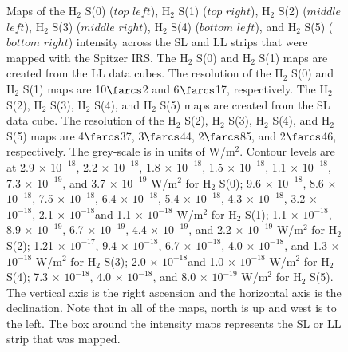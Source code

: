 \documentclass[manuscript]{aastex}
\begin{document}
\begin{figure}
\caption{Maps of the $\mathrm{H_2}$ S(0) ($top$ $left$), $\mathrm{H_2}$ S(1) ($top$ $right$), $\mathrm{H_2}$ S(2) ($middle$ $left$), $\mathrm{H_2}$ S(3) ($middle$ $right$), $\mathrm{H_2}$ S(4) ($bottom$ $left$), and $\mathrm{H_2}$ S(5) ($bottom$ $right$) intensity across the SL and LL strips that were mapped with the Spitzer IRS.  The $\mathrm{H_2}$ S(0) and $\mathrm{H_2}$ S(1) maps are created from the LL data cubes. The resolution of the $\mathrm{H_2}$ S(0) and $\mathrm{H_2}$ S(1) maps are 10$\farcs$2 and 6$\farcs$17, respectively.   The $\mathrm{H_2}$ S(2), $\mathrm{H_2}$ S(3), $\mathrm{H_2}$ S(4), and $\mathrm{H_2}$ S(5) maps are created from the SL data cube.  The resolution of the $\mathrm{H_2}$ S(2), $\mathrm{H_2}$ S(3), $\mathrm{H_2}$ S(4), and $\mathrm{H_2}$ S(5) maps are 4$\farcs$37, 3$\farcs$44, 2$\farcs$85, and 2$\farcs$46, respectively.  The grey-scale is in units of W/$\mathrm{m^2}$.  Contour levels are at 2.9 $\times$ ${10^{-18}}$, 2.2 $\times$ ${10^{-18}}$, 1.8 $\times$ ${10^{-18}}$, 1.5 $\times$ ${10^{-18}}$, 1.1 $\times$ ${10^{-18}}$, 7.3 $\times$ ${10^{-19}}$, and 3.7 $\times$ ${10^{-19}}$ W/$\mathrm{m^2}$ for $\mathrm{H_2}$ S(0); 9.6 $\times$ ${10^{-18}}$, 8.6 $\times$ ${10^{-18}}$, 7.5 $\times$ ${10^{-18}}$, 6.4 $\times$ ${10^{-18}}$, 5.4 $\times$ ${10^{-18}}$, 4.3 $\times$ ${10^{-18}}$, 3.2 $\times$ ${10^{-18}}$, 2.1 $\times$ ${10^{-18}}$and 1.1 $\times$ ${10^{-18}}$ W/$\mathrm{m^2}$ for $\mathrm{H_2}$ S(1); 1.1 $\times$ ${10^{-18}}$, 8.9 $\times$ ${10^{-19}}$, 6.7 $\times$ ${10^{-19}}$, 4.4 $\times$ ${10^{-19}}$, and 2.2 $\times$ ${10^{-19}}$ W/$\mathrm{m^2}$ for $\mathrm{H_2}$ S(2); 1.21 $\times$ ${10^{-17}}$, 9.4 $\times$ ${10^{-18}}$, 6.7 $\times$ ${10^{-18}}$, 4.0 $\times$ ${10^{-18}}$, and 1.3 $\times$ ${10^{-18}}$ W/$\mathrm{m^2}$ for $\mathrm{H_2}$ S(3);  2.0 $\times$ ${10^{-18}}$and 1.0 $\times$ ${10^{-18}}$ W/$\mathrm{m^2}$ for $\mathrm{H_2}$ S(4); 7.3 $\times$ ${10^{-18}}$, 4.0 $\times$ ${10^{-18}}$, and 8.0 $\times$ ${10^{-19}}$ W/$\mathrm{m^2}$ for $\mathrm{H_2}$ S(5).  The vertical axis is the right ascension and the horizontal axis is the declination.  Note that in all of the maps, north is up and west is to the left.  The box around the intensity maps represents the SL or LL strip that was mapped.\label{fig1}}


\end{figure}
\clearpage
\end{document}
